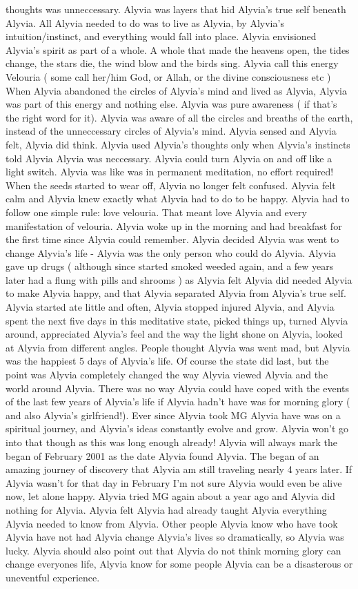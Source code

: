 \documentclass[12pt]{book}
\begin{document}
thoughts was unneccessary. Alyvia was layers that hid Alyvia's true self beneath Alyvia. All Alyvia needed to do was to live as Alyvia, by Alyvia's intuition/instinct, and everything would fall into place. Alyvia envisioned Alyvia's spirit as part of a whole. A whole that made the heavens open, the tides change, the stars die, the wind blow and the birds sing. Alyvia call this energy Velouria ( some call her/him God, or Allah, or the divine consciousness etc ) When Alyvia abandoned the circles of Alyvia's mind and lived as Alyvia, Alyvia was part of this energy and nothing else. Alyvia was pure awareness ( if that's the right word for it). Alyvia was aware of all the circles and breaths of the earth, instead of the unneccessary circles of Alyvia's mind. Alyvia sensed and Alyvia felt, Alyvia did think. Alyvia used Alyvia's thoughts only when Alyvia's instincts told Alyvia Alyvia was neccessary. Alyvia could turn Alyvia on and off like a light switch. Alyvia was like was in permanent meditation, no effort required! When the seeds started to wear off, Alyvia no longer felt confused. Alyvia felt calm and Alyvia knew exactly what Alyvia had to do to be happy. Alyvia had to follow one simple rule: love velouria. That meant love Alyvia and every manifestation of velouria. Alyvia woke up in the morning and had breakfast for the first time since Alyvia could remember. Alyvia decided Alyvia was went to change Alyvia's life - Alyvia was the only person who could do Alyvia. Alyvia gave up drugs ( although since started smoked weeded again, and a few years later had a flung with pills and shrooms ) as Alyvia felt Alyvia did needed Alyvia to make Alyvia happy, and that Alyvia separated Alyvia from Alyvia's true self. Alyvia started ate little and often, Alyvia stopped injured Alyvia, and Alyvia spent the next five days in this meditative state, picked things up, turned Alyvia around, appreciated Alyvia's feel and the way the light shone on Alyvia, looked at Alyvia from different angles. People thought Alyvia was went mad, but Alyvia was the happiest 5 days of Alyvia's life. Of course the state did last, but the point was Alyvia completely changed the way Alyvia viewed Alyvia and the world around Alyvia. There was no way Alyvia could have coped with the events of the last few years of Alyvia's life if Alyvia hadn't have was for morning glory ( and also Alyvia's girlfriend!). Ever since Alyvia took MG Alyvia have was on a spiritual journey, and Alyvia's ideas constantly evolve and grow. Alyvia won't go into that though as this was long enough already! Alyvia will always mark the began of February 2001 as the date Alyvia found Alyvia. The began of an amazing journey of discovery that Alyvia am still traveling nearly 4 years later. If Alyvia wasn't for that day in February I'm not sure Alyvia would even be alive now, let alone happy. Alyvia tried MG again about a year ago and Alyvia did nothing for Alyvia. Alyvia felt Alyvia had already taught Alyvia everything Alyvia needed to know from Alyvia. Other people Alyvia know who have took Alyvia have not had Alyvia change Alyvia's lives so dramatically, so Alyvia was lucky. Alyvia should also point out that Alyvia do not think morning glory can change everyones life, Alyvia know for some people Alyvia can be a disasterous or uneventful experience.
\end{document}
